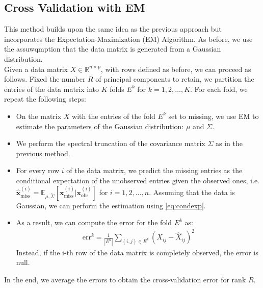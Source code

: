 \documentclass{article}
\begin{document}
\subsection{Cross Validation with EM}
This method builds upon the same idea as the previous approach but incorporates the Expectation-Maximization (EM) Algorithm. 
As before, we use the assuwqmption that the data matrix is generated from a Gaussian distribution. \\ 
Given a data matrix $X \in \mathbb{R}^{n \times p}$, with rows defined as before, we can proceed as follows.  
Fixed the number \( R \) of principal components to retain, we partition the entries of the data matrix into 
$K$ folds $E^k$ for $k = 1, 2, \dots, K$. For each fold, we repeat the following steps:
\begin{itemize}
    \item On the matrix $X$ with the entries of the fold $E^k$ set to missing, we use EM to estimate the parameters of 
          the Gaussian distribution: $\mu$ and $\Sigma$.
    \item We perform the spectral truncation of the covariance matrix $\Sigma$ as in the previous method.
    \item For every row $i$ of the data matrix, we predict the missing entries as the conditional expectation of the
          unobserved entries given the observed ones, i.e. $\hat{\textbf{x}}^{(i)}_\text{miss} = \mathbb{E}_{\mu,\tilde{\Sigma}}
          \left[ \textbf{x}^{(i)}_\text{miss} | \textbf{x}^{(i)}_\text{obs} \right]$ for $i = 1, 2, \dots, n$. 
          Assuming that the data is Gaussian, we can perform the estimation using \eqref{eq:condexp}.
     \item  As a result, we can compute the error for the fold $E^k$ as:
            \begin{gather*}
                \text{err}^k = \frac{1}{|E^k|} \sum_{(i,j) \in E^k} (X_{ij} - \hat{X}_{ij})^2
            \end{gather*}
         Instead, if the i-th row of the data matrix is completely observed, the error is null.
\end{itemize}    
In the end, we average the errors to obtain the cross-validation error for rank $R$.\\
\end{document}
